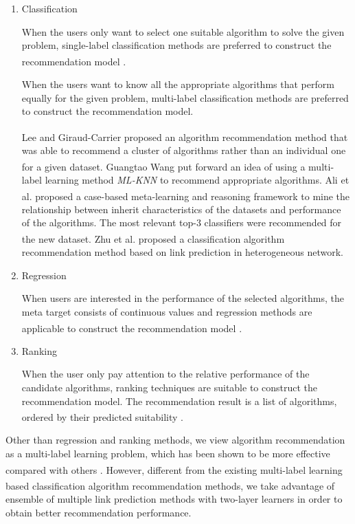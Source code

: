 \documentclass[review,3p,twocolumn,times]{elsarticle}
\newcommand{\upcite}[1]{\textsuperscript{\cite{#1}}}
\begin{document}
\begin{enumerate}[1)]
	
	\item Classification
	
	When the users only want to select one suitable algorithm to solve the given problem, single-label classification methods are preferred to construct the recommendation model \upcite{Ali2006On, Pise2016Algorithm, Yang2017Choosing}. 
	
	When the users want to know all the appropriate algorithms that perform equally for the given problem, multi-label classification methods are preferred to construct the recommendation model.
	
	Lee and Giraud-Carrier\upcite{Lee2013Automatic} proposed an algorithm recommendation method that was able to recommend a cluster of algorithms rather than an individual one for a given dataset. Guangtao Wang\upcite{Wang2014A} put forward an idea of using a multi-label learning method \emph{ML-KNN} to recommend appropriate algorithms. Ali et al.\upcite{Ali2018A} proposed a case-based meta-learning and reasoning framework to mine the relationship between inherit characteristics of the datasets and performance of the algorithms. The most relevant top-3 classifiers were recommended for the new dataset. Zhu et al.\upcite{Zhu2018A} proposed a classification algorithm recommendation method based on link prediction in heterogeneous network. 
	
	\item Regression
	
	When users are interested in the performance of the selected algorithms, the meta target consists of continuous values and regression methods are applicable to construct the recommendation model \upcite{Bensusan2001Estimating, Reif2014Automatic}.
	
	\item Ranking
	
	When the user only pay attention to the relative performance of the candidate algorithms, ranking techniques are suitable to construct the recommendation model. The recommendation result is a list of algorithms, ordered by their predicted suitability \upcite{Brazdil2000A, Brazdil2003Ranking}.
	
\end{enumerate}

Other than regression and ranking methods, we view algorithm recommendation as a multi-label learning problem, which has been shown to be more effective compared with others \upcite{Wang2014A}. However, different from the existing multi-label learning based classification algorithm recommendation methods\upcite{Wang2014A, Lee2013Automatic, Ali2018A, Zhu2018A}, we take advantage of ensemble of multiple link prediction methods with two-layer learners in order to obtain better recommendation performance. 
\end{document}
